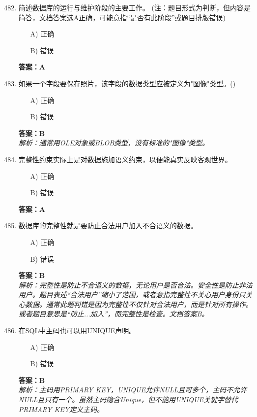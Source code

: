 \documentclass[a4paper,12pt]{article}
\begin{document}
\begin{enumerate}[label=\arabic*.]
\setcounter{enumi}{481} %

\item 简述数据库的运行与维护阶段的主要工作。 (注：题目形式为判断，但内容是简答，文档答案选A正确，可能意指“是否有此阶段”或题目排版错误)
\begin{itemize}
    \item[A)] 正确
    \item[B)] 错误
\end{itemize}
\textbf{答案：A}

\item 如果一个字段要保存照片，该字段的数据类型应被定义为"图像"类型。()
\begin{itemize}
    \item[A)] 正确
    \item[B)] 错误
\end{itemize}
\textbf{答案：B} \\
\textit{解析：通常用OLE对象或BLOB类型，没有标准的"图像"类型。}

\item 完整性约束实际上是对数据施加语义约束，以便能真实反映客观世界。
\begin{itemize}
    \item[A)] 正确
    \item[B)] 错误
\end{itemize}
\textbf{答案：A}

\item 数据库的完整性就是要防止合法用户加入不合语义的数据。
\begin{itemize}
    \item[A)] 正确
    \item[B)] 错误
\end{itemize}
\textbf{答案：B} \\
\textit{解析：完整性是防止不合语义的数据，无论用户是否合法。安全性是防止非法用户。题目表述“合法用户”缩小了范围，或者意指完整性不关心用户身份只关心数据。通常此题判错是因为完整性不仅针对合法用户，而是针对所有操作。或者题目意思是“防止...加入”，而完整性是检查。文档答案B。}

\item 在SQL中主码也可以用UNIQUE声明。
\begin{itemize}
    \item[A)] 正确
    \item[B)] 错误
\end{itemize}
\textbf{答案：B} \\
\textit{解析：主码用PRIMARY KEY，UNIQUE允许NULL且可多个，主码不允许NULL且只有一个。虽然主码隐含Unique，但不能用UNIQUE关键字替代PRIMARY KEY定义主码。}


\end{enumerate}
\end{document}
